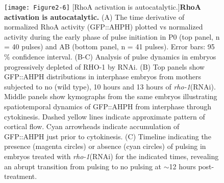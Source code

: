 \documentclass{ucetd}
\begin{document}
\begin{figure}[!htbp]
\centering
\texttt{[image: Figure2-6]}
[RhoA activation is autocatalytic.]{\textbf{RhoA activation is autocatalytic.} (A) The time derivative of normalized RhoA activity (GFP::AHPH) plotted vs normalized activity during the early phase of pulse initiation in P0 (top panel, n = 40 pulses) and AB (bottom panel, n = 41 pulses). Error bars: 95$\%$ confidence interval. (B-C) Analysis of pulse dynamics in embryos progressively depleted of RHO-1 by RNAi.  (B) Top panels show GFP::AHPH distributions in interphase embryos from mothers subjected to no (wild type), 10 hours and 13 hours of \textit{rho-1}(RNAi). Middle panels  show kymographs from the same embryos illustrating spatiotemporal dynamics of GFP::AHPH  from interphase through cytokinesis.  Dashed yellow lines indicate approximate pattern of cortical flow.  Cyan arrowheads indicate accumulation of GFP::AHPH just prior to cytokinesis.  (C) Timeline indicating the presence (magenta circles) or absence (cyan circles) of pulsing in embryos treated with \textit{rho-1}(RNAi) for the indicated times, revealing an abrupt transition from pulsing to no pulsing at $\sim$12 hours post-treatment.}
\end{figure}
\end{document}
